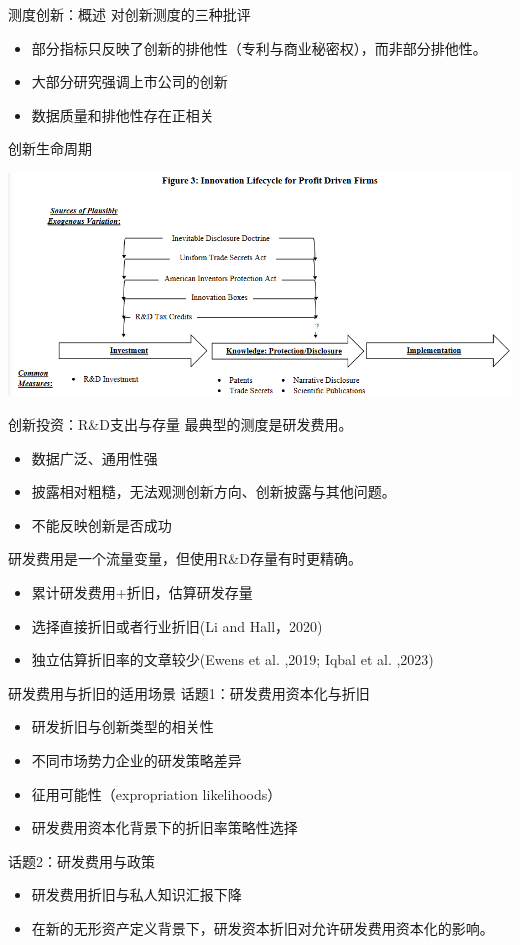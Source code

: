 \documentclass{beamer}
\begin{document}
\begin{frame}{测度创新：概述}
	对创新测度的三种批评
	\begin{itemize}
		\item 部分指标只反映了创新的排他性（专利与商业秘密权），而非部分排他性。
		\item 大部分研究强调上市公司的创新
		\item 数据质量和排他性存在正相关
	\end{itemize}
	创新生命周期
	\begin{center}
		\includegraphics[width=0.8\linewidth]{pic/fig3.png}
	\end{center}
\end{frame}

\begin{frame}{创新投资：R\&D支出与存量}
	最典型的测度是研发费用。
	\begin{itemize}
		\item[] 数据广泛、通用性强
		\item[] 披露相对粗糙，无法观测创新方向、创新披露与其他问题。
		\item[] 不能反映创新是否成功
	\end{itemize}
	研发费用是一个流量变量，但使用R\&D存量有时更精确。
	\begin{itemize}
		\item 累计研发费用+折旧，估算研发存量
		\item[] 选择直接折旧或者行业折旧(Li and Hall，2020)
		\item[] 独立估算折旧率的文章较少(Ewens et al. ,2019; Iqbal et al. ,2023)
	\end{itemize}
\end{frame}

\begin{frame}{研发费用与折旧的适用场景}
	话题1：研发费用资本化与折旧
	\begin{itemize}
		\item 研发折旧与创新类型的相关性
		\item 不同市场势力企业的研发策略差异
		\item 征用可能性（expropriation likelihoods）
		\item 研发费用资本化背景下的折旧率策略性选择
	\end{itemize}
	话题2：研发费用与政策
	\begin{itemize}
		\item 研发费用折旧与私人知识汇报下降
		\item 在新的无形资产定义背景下，研发资本折旧对允许研发费用资本化的影响。
	\end{itemize}
\end{frame}
\end{document}
